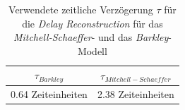 \begin{table}[h]
\centering
\begin{tabular}{|c|c|}
$\tau_{Barkley}$ & $\tau_{Mitchell-Schaeffer}$ \\ 
\hline 
\hline 
0.64 Zeiteinheiten & 2.38 Zeiteinheiten\\ 
\hline 
\end{tabular} 
\caption{Verwendete zeitliche Verzögerung $\tau$ für die \textit{Delay Reconstruction} für das \textit{Mitchell-Schaeffer}- und das \textit{Barkley}-Modell}
\label{tab:delay_reconstruction_tau}
\end{table} 



